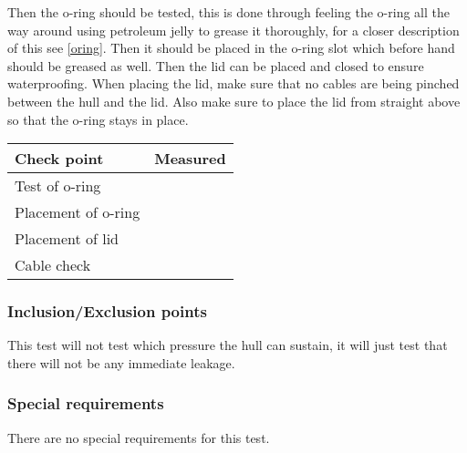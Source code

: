 Then the o-ring should be tested, this is done through feeling the o-ring all the way around using petroleum jelly to grease it thoroughly, for a closer description of this see \ref{oring}. Then it should be placed in the o-ring slot which before hand should be greased as well. Then the lid can be placed and closed to ensure waterproofing. When placing the lid, make sure that no cables are being pinched between the hull and the lid. Also make sure to place the lid from straight above so that the o-ring stays in place. 

\begin{tabular}{| l | c |}
\hline
Check point & Measured \\ \hline
Test of o-ring &  \\ \hline
Placement of o-ring &  \\ \hline
Placement of lid &  \\ \hline
Cable check & \\ \hline
\end{tabular} 
\subsubsection*{Inclusion/Exclusion points}
This test will not test which pressure the hull can sustain, it will just test that there will not be any immediate leakage. 
\subsubsection*{Special requirements}
There are no special requirements for this test. 